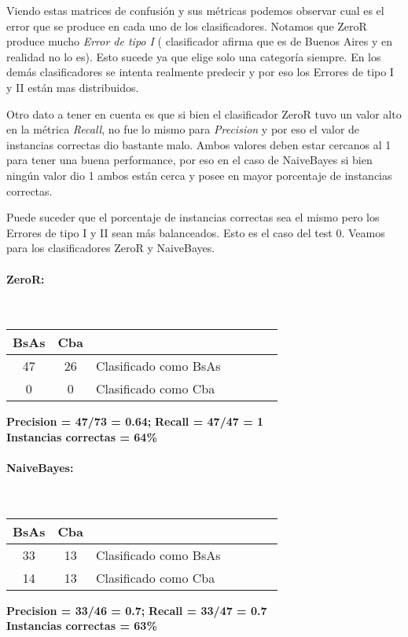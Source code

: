 Viendo estas matrices de confusión y sus métricas podemos observar cual es el error que se produce en cada uno de los clasificadores. Notamos que ZeroR produce mucho \textit{Error de tipo I} ( clasificador afirma que es de Buenos Aires y en realidad no lo es). Esto sucede ya que elige solo una categoría siempre. En los demás clasificadores se intenta realmente  predecir y por eso los Errores de tipo I y II están mas distribuidos.

Otro dato a tener en cuenta es que si bien el clasificador ZeroR tuvo un valor alto en la métrica \textit{Recall}, no fue lo mismo para \textit{Precision} y por eso el valor de instancias correctas dio bastante malo. Ambos valores deben estar cercanos al 1 para tener una buena performance, por eso en el caso de NaiveBayes si bien ningún valor dio 1 ambos están cerca y posee en mayor porcentaje de instancias correctas.

Puede suceder que el porcentaje de instancias correctas sea el mismo pero los Errores de tipo I y II sean más balanceados. Esto es el caso del test 0. Veamos para los clasificadores ZeroR y NaiveBayes.

\paragraph*{ZeroR:}\mbox{}\\
\begin{table}[H]
\centering
\begin{tabular}{|c|c|l|c|c|c|c|}
\hline
 BsAs & Cba &  \\ \hline
 47 &  26 &  Clasificado como BsAs \\ \hline
 0 &  0 &  Clasificado como Cba \\ \hline
\end{tabular}
\end{table}
\begin{center}
\textbf{Precision = 47/73 = 0.64;} \textbf{Recall = 47/47 = 1}\\
\textbf{Instancias correctas = 64\%}
\end{center}

\paragraph*{NaiveBayes:}\mbox{}\\
\begin{table}[H]
\centering
\begin{tabular}{|c|c|l|c|c|c|c|}
\hline
 BsAs & Cba &  \\ \hline
 33 &  13 &  Clasificado como BsAs \\ \hline
 14 &  13 &  Clasificado como Cba \\ \hline
\end{tabular}
\end{table}
\begin{center}
\textbf{Precision = 33/46 = 0.7;} \textbf{Recall = 33/47 = 0.7}\\
\textbf{Instancias correctas = 63\%}
\end{center}

